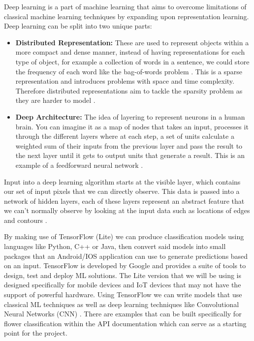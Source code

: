 \documentclass[12pt,a4paper]{report}
\begin{document}
\par

Deep learning is a part of machine learning that aims to overcome limitations of classical machine learning techniques 
by expanding upon representation learning. Deep learning can be split into two unique parts:

\begin{itemize}
    \item \textbf{Distributed Representation:} These are used to represent objects within a more compact and dense manner, 
instead of having representations for each type of object, for example a collection of words in a sentence, we could 
store the frequency of each word like the bag-of-words problem \citep{liu2020representation}. This is a sparse
representation and introduces problems with space and time complexity. Therefore distributed representations aim to 
tackle the sparsity problem as they are harder to model \citep{Brownlee2017}.
    \item \textbf{Deep Architecture:} The idea of layering to represent neurons in a human brain. You can imagine it as a map of 
nodes that takes an input, processes it through the different layers where at each step, a set of units calculate a 
weighted sum of their inputs from the previous layer and pass the result to the next layer until it gets to output units
that generate a result. This is an example of a feedforward neural network \citep{lecun2015deep}.
\end{itemize}

\par

Input into a deep learning algorithm starts at the visible layer, which contains our set of input pixels that we can 
directly observe. This data is passed into a network of hidden layers, each of these layers represent an abstract 
feature that we can't normally observe by looking at the input data such as locations of edges and contours 
\citep[p. 26]{goodfellow2016deep}.

\par

By making use of TensorFlow (Lite) we can produce classification models using languages like Python, C++ or Java, then 
convert said models into small packages that an Android/IOS application can use to generate predictions based on an 
input. TensorFlow is developed by Google and provides a suite of tools to design, test and 
deploy ML solutions. The Lite version that we will be using is designed specifically for mobile devices and IoT devices 
that may not have the support of powerful hardware. Using TensorFlow we can write models that use classical ML 
techniques as well as deep learning techniques like Convolutional Neural Networks (CNN) \citep{googleTF2}. 
There are examples that can be built specifically for flower classification within the API documentation which can serve
as a starting point for the project.
\end{document}
